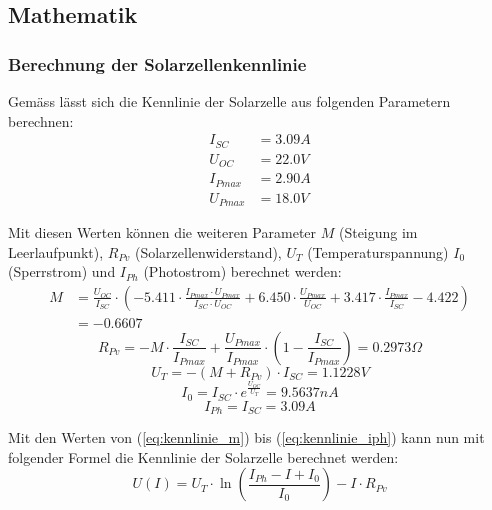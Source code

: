 \subsection{Mathematik}\label{subsec_mathe}

\subsubsection{Berechnung der Solarzellenkennlinie}

Gemäss \cite{photovoltaik_engineering} lässt sich die Kennlinie der Solarzelle aus folgenden Parametern berechnen:
\begin{align*}
	I_{SC} &= 3.09A \\
	U_{OC} &= 22.0V \\
	I_{Pmax} &= 2.90A \\
	U_{Pmax} &= 18.0V
\label{eq:eingangsparameter_kennlinie}
\end{align*}

Mit diesen Werten können die weiteren Parameter $M$ (Steigung im Leerlaufpunkt), $R_{Pv}$ (Solarzellenwiderstand), $U_T$ (Temperaturspannung) $I_0$ (Sperrstrom) und $I_{Ph}$ (Photostrom) berechnet werden:
\begin{equation}\begin{split}
	M&=\frac{U_{OC}}{I_{SC}}\cdot\left(-5.411\cdot\frac{I_{Pmax}\cdot U_{Pmax}}{I_{SC}\cdot U_{OC}}+6.450\cdot\frac{U_{Pmax}}{U_{OC}}+3.417\cdot\frac{I_{Pmax}}{I_{SC}}-4.422\right) \\
	&=-0.6607
\label{eq:kennlinie_m}
\end{split}\end{equation}
\begin{equation}
	R_{Pv}=-M\cdot\frac{I_{SC}}{I_{Pmax}}+\frac{U_{Pmax}}{I_{Pmax}}\cdot\left(1-\frac{I_{SC}}{I_{Pmax}}\right)=0.2973\Omega
\label{eq:kennlinie_rpv}
\end{equation}
\begin{equation}
	U_T=-\left(M+R_{Pv}\right)\cdot I_{SC}=1.1228V
\label{eq:kennlinie_ut}
\end{equation}
\begin{equation}
	I_0=I_{SC}\cdot e^{\frac{U_{OC}}{U_T}}=9.5637nA
\label{eq:}
\end{equation}
\begin{equation}
	I_{Ph}=I_{SC}=3.09A
\label{eq:kennlinie_iph}
\end{equation}

Mit den Werten von (\ref{eq:kennlinie_m}) bis (\ref{eq:kennlinie_iph}) kann nun mit folgender Formel die Kennlinie der Solarzelle berechnet werden:
\begin{equation}
	U\left(I\right)=U_T\cdot\ln\left(\frac{I_{Ph}-I+I_0}{I_0}\right)-I\cdot R_{Pv}
\label{eq:kennlinie}
\end{equation}

